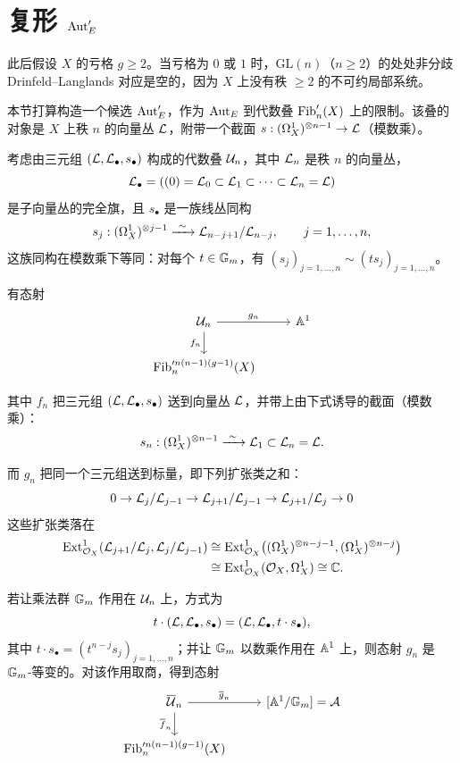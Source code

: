 \section{复形 ${\operatorname{Aut}}'_E$}

此后假设 $X$ 的亏格 $g\ge 2$。当亏格为 $0$ 或 $1$ 时，$\mathrm{GL}(n)$（$n\ge 2$）的处处非分歧
Drinfeld--Langlands 对应是空的，因为 $X$ 上没有秩 $\ge 2$ 的不可约局部系统。

本节打算构造一个候选 ${\operatorname{Aut}}'_E$，作为 $\operatorname{Aut}_E$ 到代数叠 $\operatorname{Fib}'_n(X)$ 上的限制。该叠的对象是
$X$ 上秩 $n$ 的向量丛 $\mathcal{L}$，附带一个截面 $s:(\Omega^{1}_{X})^{\otimes n-1}\to\mathcal{L}$（模数乘）。

考虑由三元组 $(\mathcal{L},\mathcal{L}_\bullet,s_\bullet)$ 构成的代数叠 $\mathcal{U}_n$，其中 $\mathcal{L}_n$ 是秩 $n$ 的向量丛，
\[
  \mathcal{L}_\bullet=((0)=\mathcal{L}_0\subset\mathcal{L}_1\subset\cdots\subset\mathcal{L}_n=\mathcal{L})
\]
是子向量丛的完全旗，且 $s_\bullet$ 是一族线丛同构
\[
  s_j:(\Omega^{1}_{X})^{\otimes j-1}\xrightarrow{\ \sim\ }\mathcal{L}_{n-j+1}/\mathcal{L}_{n-j},\qquad j=1,\dots,n,
\]
这族同构在模数乘下等同：对每个 $t\in\mathbb{G}_m$，有
$(s_j)_{j=1,\dots,n}\sim(ts_j)_{j=1,\dots,n}$。

有态射
\[
  \begin{tikzcd}
    \cU_n \arrow[r,"g_n"] \arrow[d,swap,"f_n"] & \A^1 \\
    \Fib'^{n(n-1)(g-1)}_n(X) &
  \end{tikzcd}
\]

其中 $f_n$ 把三元组 $(\mathcal{L},\mathcal{L}_\bullet,s_\bullet)$ 送到向量丛 $\mathcal{L}$，并带上由下式诱导的截面（模数乘）：
\[
  s_n:(\OmX)^{\otimes n-1}\xrightarrow{\ \sim\ }\cL_1\subset\cL_n=\cL.
\]

而 $g_n$ 把同一个三元组送到标量，即下列扩张类之和：
\[
  0\to\mathcal{L}_j/\mathcal{L}_{j-1}\to\mathcal{L}_{j+1}/\mathcal{L}_{j-1}\to\mathcal{L}_{j+1}/\mathcal{L}_j\to 0
\]
这些扩张类落在
\[
  \begin{aligned}
    \operatorname{Ext}^1_{\mathcal{O}_X}(\mathcal{L}_{j+1}/\mathcal{L}_j,\mathcal{L}_j/\mathcal{L}_{j-1})
    &\cong\operatorname{Ext}^1_{\mathcal{O}_X}\bigl((\Omega^{1}_{X})^{\otimes n-j-1},(\Omega^{1}_{X})^{\otimes n-j}\bigr)\\
    &\cong\operatorname{Ext}^1_{\mathcal{O}_X}(\mathcal{O}_X,\Omega^{1}_{X})\cong\mathbb{C}.
  \end{aligned}
\]

若让乘法群 $\mathbb{G}_m$ 作用在 $\mathcal{U}_n$ 上，方式为
\[
  t\cdot(\mathcal{L},\mathcal{L}_\bullet,s_\bullet)=(\mathcal{L},\mathcal{L}_\bullet,t\cdot s_\bullet),
\]
其中 $t\cdot s_\bullet=(t^{n-j}s_j)_{j=1,\dots,n}$；并让 $\mathbb{G}_m$ 以数乘作用在 $\mathbb{A}^1$ 上，则态射
$g_n$ 是 $\mathbb{G}_m$-等变的。对该作用取商，得到态射
\[
  \begin{tikzcd}
    \overline{\cU}_n \arrow[r,"\overline g_n"] \arrow[d,swap,"\overline f_n"]
      & {[\A^1/\Gm]=\cA} \\
    \Fib'^{n(n-1)(g-1)}_n(X) &
  \end{tikzcd}
\]

